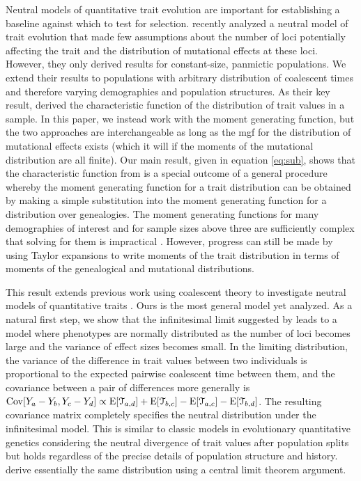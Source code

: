 Neutral models of quantitative trait evolution are important for establishing a
baseline against which to test for selection. \citet{Schraiber2015} recently
analyzed a neutral model of trait evolution that made few assumptions about the
number of loci potentially affecting the trait and the distribution of
mutational effects at these loci. However, they only derived results for
constant-size, panmictic populations. We extend their results to populations
with arbitrary distribution of coalescent times and therefore varying
demographies and population structures. As their key result,
\citet{Schraiber2015} derived the characteristic function of the distribution of
trait values in a sample. In this paper, we instead work with the moment
generating function, but the two approaches are interchangeable as long as the
mgf for the distribution of mutational effects exists (which it will if the
moments of the mutational distribution are all finite). Our main result, given
in equation \eqref{eq:sub}, shows that the characteristic function
from \citet{Schraiber2015} is a special outcome of a general procedure whereby
the moment generating function for a trait distribution can be obtained by
making a simple substitution into the moment generating function for a
distribution over genealogies. The moment generating functions for many
demographies of interest and for sample sizes above three are sufficiently
complex that solving for them is impractical \citep{Lohse2011}. However,
progress can still be made by using Taylor expansions to write moments of the
trait distribution in terms of moments of the genealogical and mutational
distributions.

This result extends previous work using coalescent theory to investigate neutral
models of quantitative traits \citep{Whitlock1999,Schraiber2015}. Ours is the
most general model yet analyzed. As a natural first step, we show that the
infinitesimal limit suggested by \citet{Fisher1918} leads to a model where
phenotypes are normally distributed as the number of loci becomes large and the
variance of effect sizes becomes small. In the limiting distribution, the
variance of the difference in trait values between two individuals is
proportional to the expected pairwise coalescent time between them, and the
covariance between a pair of differences more generally is $\mathrm{Cov}[Y_a - Y_b,Y_c -
Y_d] \propto \mathrm{E}[\mathcal{T}_{a,d}] + \mathrm{E}[\mathcal{T}_{b,c}] -
\mathrm{E}[\mathcal{T}_{a,c}] - \mathrm{E}[\mathcal{T}_{b,d}]$. The resulting covariance matrix
completely specifies the neutral distribution under the infinitesimal model.
This is similar to classic models in evolutionary quantitative genetics
considering the neutral divergence of trait values after population splits
\citep{Lande1976,Lynch1989} but holds regardless of the precise details of
population structure and history. \citet{Schraiber2015} derive essentially the
same distribution using a central limit theorem argument. 


